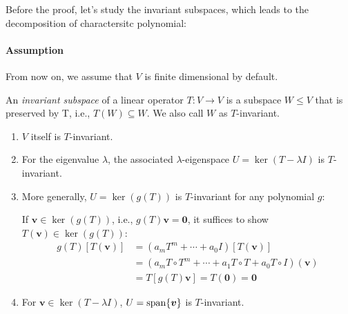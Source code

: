 Before the proof, let's study the invariant subspaces, which leads to the decomposition of charactersitc polynomial:
\paragraph{Assumption}
From now on, we assume that $V$ is finite dimensional by default.
\begin{definition}
An \emph{invariant subspace} of a linear operator $T:V\to V$ is a subspace $W\le V$ that is preserved by T, i.e., $T(W)\subseteq W$. We also call $W$ as $T$-invariant.
\end{definition}
\begin{example}
\begin{enumerate}
\item
$V$ itself is $T$-invariant.
\item
For the eigenvalue $\lambda$, the associated $\lambda$-eigenspace $U=\ker(T-\lambda I)$ is $T$-invariant.
\item
More generally, 
$U=\ker(g(T))$ is $T$-invariant for any polynomial $g$:

If $\bm v\in\ker(g(T))$, i.e., $g(T)\bm v=\bm0$, it suffices to show $T(\bm v)\in\ker(g(T))$:
\begin{align*}
g(T)[T(\bm v)] &= (a_mT^m+\cdots+a_0I)[T(\bm v)]\\
&=
(a_mT\circ T^m+\cdots+a_1T\circ T+a_0T\circ I)(\bm v)\\
&=
T[g(T)\bm v]=T(\bm 0)=\bm0
\end{align*}
\item
For $\bm v\in\ker(T-\lambda I)$, $U=\operatorname{span}\{\bm v\}$ is $T$-invariant.
\end{enumerate}
\end{example}

